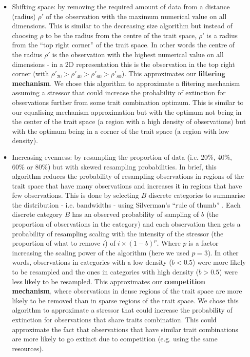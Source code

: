 \documentclass[12pt,letterpaper]{article}
\begin{document}
\begin{itemize}
\item Shifting space: by removing the required amount of data from a distance (radius) $\rho'$ of the observation with the maximum numerical value on all dimensions.
This is similar to the decreasing size algorithm but instead of choosing $\rho$ to be the radius from the centre of the trait space, $\rho'$ is a radius from the ``top right corner'' of the trait space.
In other words the centre of the radius $\rho'$ is the observation with the highest numerical value on all dimensions - in a 2D representation this is the observation in the top right corner (with $\rho'_{20} > \rho'_{40} > \rho'_{60} > \rho'_{80}$).
This approximates our \textbf{filtering mechanism}.
We chose this algorithm to approximate a flitering mechanism assuming a stressor that could increase the probability of extinction for observations further from some trait combination optimum.
This is similar to our equalising mechanism approximation but with the optimum not being in the center of the trait space (a region with a high density of observations) but with the optimum being in a corner of the trait space (a region with low density).

\item Increasing evenness: by resampling the proportion of data (i.e. 20\%, 40\%, 60\% or 80\%) but with skewed resampling probabilities.
In brief, this algorithm reduces the probability of resampling observations in regions of the trait space that have many observations and increases it in regions that have few observations.
This is done by selecting $B$ discrete categories to summarise the distribution - i.e. bandwidths - using Silverman's ``rule of thumb'' \citep[\texttt{bw.nrd0()} function in \texttt{R};][]{silverman1986density}.
Each discrete category $B$ has an observed probability of sampling of $b$ (the proportion of observations in the category) and each observation then gets a probability of resampling scaling with the intensity of the stressor (the proportion of what to remove $i$) of $i \times (1-b)^{p}$. 
Where $p$ is a factor increasing the scaling power of the algorithm (here we used $p=3$).
In other words, observations in categories with a low density ($b<0.5$) were more likely to be resampled and the ones in categories with high density ($b>0.5$) were less likely to be resampled.
This approximates our \textbf{competition mechanism}, where observations in dense regions of the trait space are more likely to be removed than in sparse regions of the trait space.
We chose this algorithm to approximate a stressor that could increase the probability of extinction for observations that share traits combination.
This could approximate the fact that observations that have similar trait combinations are more likely to go extinct due to competition (e.g. using the same resources). 
\end{itemize}
\end{document}
